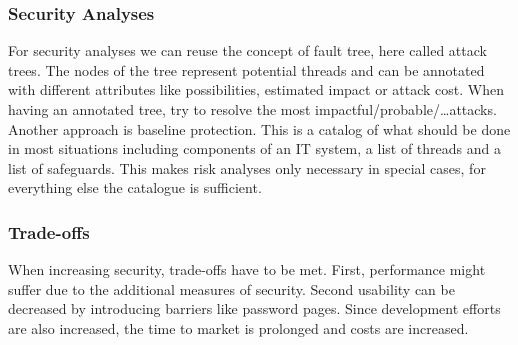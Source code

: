 \subsubsection{Security Analyses}
For security analyses we can reuse the concept of fault tree, here called attack trees.
The nodes of the tree represent potential threads and can be annotated with different attributes like possibilities, estimated impact or attack cost.
When having an annotated tree, try to resolve the most impactful/probable/\ldots attacks.\\
Another approach is baseline protection.
This is a catalog of what should be done in most situations including components of an IT system, a list of threads and a list of safeguards.
This makes risk analyses only necessary in special cases, for everything else the catalogue is sufficient.

\subsubsection{Trade-offs}
When increasing security, trade-offs have to be met.
First, performance might suffer due to the additional measures of security.
Second usability can be decreased by introducing barriers like password pages.
Since development efforts are also increased, the time to market is prolonged and costs are increased.

